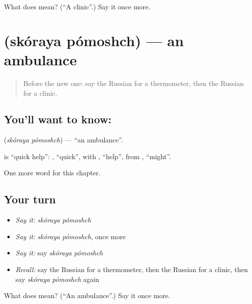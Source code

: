 \begin{tcolorbox}[breakable,colback=teal!4,colframe=teal!35!black,title={Before you move on}]
What does  mean? (\textquotedblleft{}A clinic\textquotedblright{}.) Say it once more.
\end{tcolorbox}
\section[\texorpdfstring{\ru{скорая} \ru{помощь} (skóraya pómoshch)}{скорая помощь (skóraya pómoshch)}]{  (skóraya pómoshch) — an ambulance}

\label{lesson:RU-C238-skoraya-pomoshch}



\begin{quote}
Before the new one: say the Russian for a thermometer, then the Russian for a clinic.
\end{quote}

\subsection*{You'll want to know:  }
\textbf{ } (\emph{skóraya pómoshch}) — \textquotedblleft{}an ambulance\textquotedblright{}.

\begin{cousinweb}
\textbf{ } is \textquotedblleft{}quick help\textquotedblright{}: \emph{}, \textquotedblleft{}quick\textquotedblright{}, with \emph{}, \textquotedblleft{}help\textquotedblright{}, from \emph{}, \textquotedblleft{}might\textquotedblright{}.
\end{cousinweb}

\begin{grammarlens}[title={What you've built}]
One more word for this chapter.
\end{grammarlens}

\subsection*{Your turn}
\begin{itemize}
\raggedright
  \item \emph{Say it:} \emph{skóraya pómoshch}
  \item \emph{Say it:} \emph{skóraya pómoshch}, once more
  \item \emph{Say it:} say \emph{skóraya pómoshch}
  \item \emph{Recall:} say the Russian for a thermometer, then the Russian for a clinic, then say \emph{skóraya pómoshch} again
\end{itemize}

\begin{tcolorbox}[breakable,colback=teal!4,colframe=teal!35!black,title={Before you move on}]
What does   mean? (\textquotedblleft{}An ambulance\textquotedblright{}.) Say it once more.
\end{tcolorbox}
